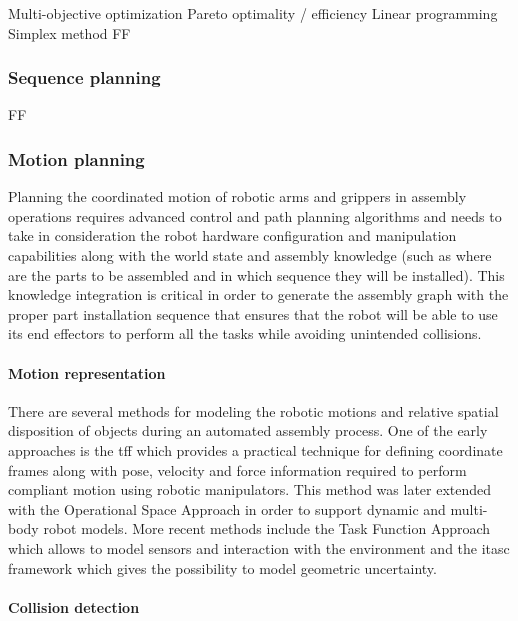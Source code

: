 Multi-objective optimization
	Pareto optimality / efficiency
Linear programming
	Simplex method
FF


\subsubsection{Sequence planning}

FF


\subsubsection{Motion planning}

Planning the coordinated motion of robotic arms \cite{Rickert2011} and grippers in assembly operations requires advanced control \cite{Stolt2015} and path planning algorithms \cite{Kuffner2000,You2012,Fontanals2014,mopl2015} and needs to take in consideration the robot hardware configuration and manipulation capabilities along with the world state and assembly knowledge \cite{Tenorth14} (such as where are the parts to be assembled and in which sequence they will be installed). This knowledge integration is critical in order to generate the assembly graph with the proper part installation sequence that ensures that the robot will be able to use its end effectors to perform all the tasks \cite{Thomas2003,Thomas2011} while avoiding unintended collisions.


\paragraph{Motion representation}

There are several methods for modeling the robotic motions and relative spatial disposition of objects during an automated assembly process. One of the early approaches is the \gls{tff} \cite{Mason1981,Finkemeyer2004} which provides a practical technique for defining coordinate frames along with pose, velocity and force information required to perform compliant motion using robotic manipulators. This method was later extended with the Operational Space Approach \cite{Khatib1987,DeSapio2006} in order to support dynamic and multi-body robot models. More recent methods include the Task Function Approach \cite{Samson1991} which allows to model sensors and interaction with the environment and the \gls{itasc} framework \cite{DeSchutter-ijrr2007,Smits2010} which gives the possibility to model geometric uncertainty.


\paragraph{Collision detection}

